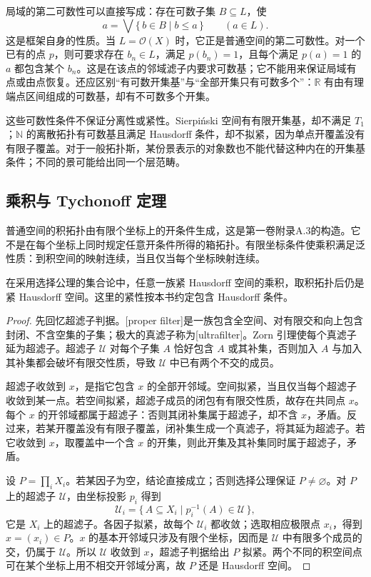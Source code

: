 \ProseParagraphBreak
局域的第二可数性可以直接写成：存在可数子集 \(B\subseteq L\)，使
\[
	a=\bigvee\{\,b\in B\mid b\le a\,\}\qquad(a\in L).
\]
这是框架自身的性质。当 \(L=\mathcal O(X)\) 时，它正是普通空间的第二可数性。对一个已有的点 \(p\)，则可要求存在 \(b_n\in L\)，满足 \(p(b_n)=1\)，且每个满足 \(p(a)=1\) 的 \(a\) 都包含某个 \(b_n\)。这是在该点的邻域滤子内要求可数基；它不能用来保证局域有点或由点恢复。还应区别“有可数开集基”与“全部开集只有可数多个”：\(\mathbb R\) 有由有理端点区间组成的可数基，却有不可数多个开集。

\ProseParagraphBreak
这些可数性条件不保证分离性或紧性。Sierpiński 空间有有限开集基，却不满足 \(T_1\)；\(\mathbb N\) 的离散拓扑有可数基且满足 Hausdorff 条件，却不拟紧，因为单点开覆盖没有有限子覆盖。对于一般拓扑斯，某份景表示的对象数也不能代替这种内在的开集基条件；不同的景可能给出同一个层范畴。

\subsection{乘积与 Tychonoff 定理}
\label{b4:subsec:localic-tychonoff}

普通空间的积拓扑由有限个坐标上的开条件生成，这是第一卷附录A.3的构造。它不是在每个坐标上同时规定任意开条件所得的箱拓扑。有限坐标条件使乘积满足泛性质：到积空间的映射连续，当且仅当每个坐标映射连续。

\begin{theorem}[Tychonoff 定理]\label{b4:thm:space-tychonoff}
	在采用选择公理的集合论中，任意一族紧 Hausdorff 空间的乘积，取积拓扑后仍是紧 Hausdorff 空间。这里的紧性按本书约定包含 Hausdorff 条件。
\end{theorem}
\begin{proof}
	先回忆超滤子判据。[proper filter]是一族包含全空间、对有限交和向上包含封闭、不含空集的子集；极大的真滤子称为[ultrafilter]。Zorn 引理使每个真滤子延为超滤子。超滤子 \(\mathcal U\) 对每个子集 \(A\) 恰好包含 \(A\) 或其补集，否则加入 \(A\) 与加入其补集都会破坏有限交性质，导致 \(\mathcal U\) 中已有两个不交的成员。

	超滤子收敛到 \(x\)，是指它包含 \(x\) 的全部开邻域。空间拟紧，当且仅当每个超滤子收敛到某一点。若空间拟紧，超滤子成员的闭包有有限交性质，故存在共同点 \(x\)。每个 \(x\) 的开邻域都属于超滤子：否则其闭补集属于超滤子，却不含 \(x\)，矛盾。反过来，若某开覆盖没有有限子覆盖，闭补集生成一个真滤子，将其延为超滤子。若它收敛到 \(x\)，取覆盖中一个含 \(x\) 的开集，则此开集及其补集同时属于超滤子，矛盾。

	设 \(P=\prod_iX_i\)。若某因子为空，结论直接成立；否则选择公理保证 \(P\ne\varnothing\)。对 \(P\) 上的超滤子 \(\mathcal U\)，由坐标投影 \(p_i\) 得到
	\[
		\mathcal U_i=\{\,A\subseteq X_i\mid p_i^{-1}(A)\in\mathcal U\,\},
	\]
	它是 \(X_i\) 上的超滤子。各因子拟紧，故每个 \(\mathcal U_i\) 都收敛；选取相应极限点 \(x_i\)，得到 \(x=(x_i)\in P\)。\(x\) 的基本开邻域只涉及有限个坐标，因而是 \(\mathcal U\) 中有限多个成员的交，仍属于 \(\mathcal U\)。所以 \(\mathcal U\) 收敛到 \(x\)，超滤子判据给出 \(P\) 拟紧。两个不同的积空间点可在某个坐标上用不相交开邻域分离，故 \(P\) 还是 Hausdorff 空间。
\end{proof}

